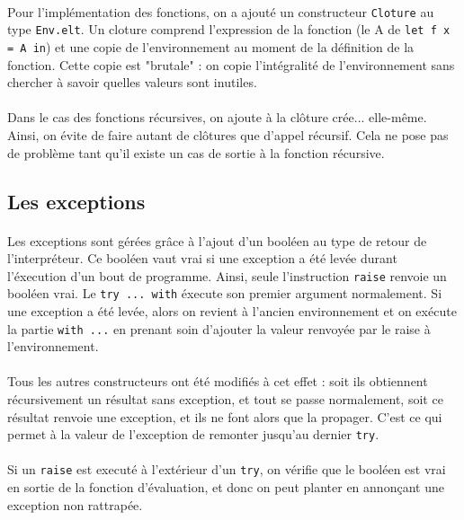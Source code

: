 \paragraph{} Pour l'implémentation des fonctions, on a ajouté un constructeur \texttt{Cloture} au type \texttt{Env.elt}.  Un cloture comprend l'expression de la fonction (le A de \texttt{let f x = A in}) et une copie de l'environnement au moment de la définition de la fonction. Cette copie est "brutale" : on copie l'intégralité de l'environnement sans chercher à savoir quelles valeurs sont inutiles.

\paragraph{} Dans le cas des fonctions récursives, on ajoute à la clôture crée... elle-même. Ainsi, on évite de faire autant de clôtures que d'appel récursif. Cela ne pose pas de problème tant qu'il existe un cas de sortie à la fonction récursive.


\subsection{Les exceptions}

\paragraph{} Les exceptions sont gérées grâce à l'ajout d'un booléen au type de retour de l'interpréteur. Ce booléen vaut vrai si une exception a été levée durant l'éxecution d'un bout de programme. Ainsi, seule l'instruction \texttt{raise} renvoie un booléen vrai. Le \texttt{try ... with} éxecute son premier argument normalement. Si une exception a été levée, alors on revient à l'ancien environnement et on exécute la partie \texttt{with ...} en prenant soin d'ajouter la valeur renvoyée par le raise à l'environnement.

\paragraph{} Tous les autres constructeurs ont été modifiés à cet effet : soit ils obtiennent récursivement un résultat sans exception, et tout se passe normalement, soit ce résultat renvoie une exception, et ils ne font alors que la propager. C'est ce qui permet à la valeur de l'exception de remonter jusqu'au dernier \texttt{try}.

\paragraph{} Si un \texttt{raise} est executé à l'extérieur d'un \texttt{try}, on vérifie que le booléen est vrai en sortie de la fonction d'évaluation, et donc on peut planter en annonçant une exception non rattrapée.

